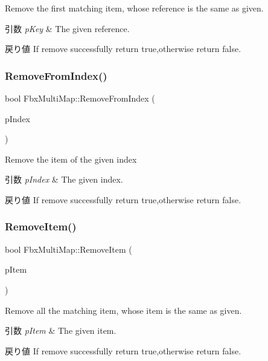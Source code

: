 Remove the first matching item, whose reference is the same as given. 
\begin{DoxyParams}{引数}
{\em p\+Key} & The given reference. \\
\hline
\end{DoxyParams}
\begin{DoxyReturn}{戻り値}
If remove successfully return true,otherwise return false. 
\end{DoxyReturn}
\mbox{\label{class_fbx_multi_map_a8511db42672da436f2c385171ca6f174}} 
\subsubsection{\texorpdfstring{Remove\+From\+Index()}{RemoveFromIndex()}}
{\footnotesize\ttfamily bool Fbx\+Multi\+Map\+::\+Remove\+From\+Index (\begin{DoxyParamCaption}\item[{int}]{p\+Index }\end{DoxyParamCaption})}

Remove the item of the given index 
\begin{DoxyParams}{引数}
{\em p\+Index} & The given index. \\
\hline
\end{DoxyParams}
\begin{DoxyReturn}{戻り値}
If remove successfully return true,otherwise return false. 
\end{DoxyReturn}
\mbox{\label{class_fbx_multi_map_a6aa9b2ddee4842a0547430264fa9caa1}} 
\subsubsection{\texorpdfstring{Remove\+Item()}{RemoveItem()}}
{\footnotesize\ttfamily bool Fbx\+Multi\+Map\+::\+Remove\+Item (\begin{DoxyParamCaption}\item[{Fbx\+Handle}]{p\+Item }\end{DoxyParamCaption})}

Remove all the matching item, whose item is the same as given. 
\begin{DoxyParams}{引数}
{\em p\+Item} & The given item. \\
\hline
\end{DoxyParams}
\begin{DoxyReturn}{戻り値}
If remove successfully return true,otherwise return false. 
\end{DoxyReturn}
\mbox{\label{class_fbx_multi_map_a33b8107d8815b1628aa6e743349ac00a}} 
